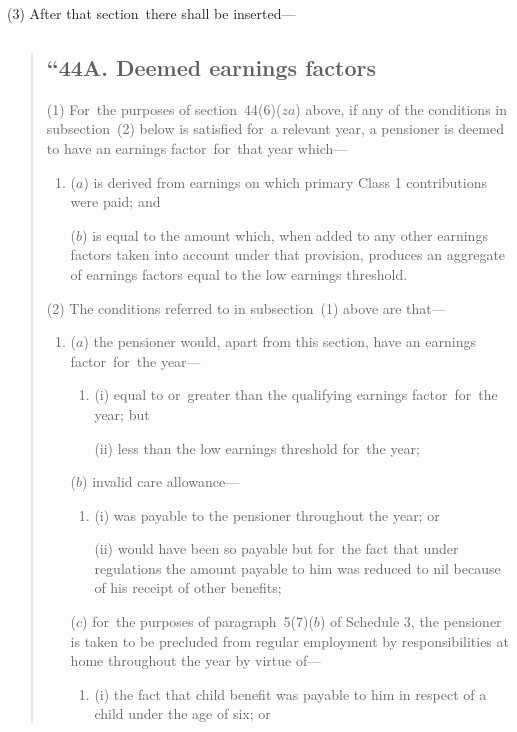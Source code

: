 \documentclass[12pt,a4paper]{article}
\begin{document}
(3) After that section~there shall be inserted—
\begin{quotation}
\subsection*{“44A. Deemed earnings factors}

(1) For~the purposes of section~44(6)($za$)  above, if any of the conditions in subsection~(2)  below is satisfied for~a relevant year, a pensioner is deemed to have an earnings factor~for~that year which—
\begin{enumerate}\item[]
($a$) is derived from earnings on which primary Class 1 contributions were paid; and

($b$) is equal to the amount which, when added to any other earnings factors taken into account under that provision, produces an aggregate of earnings factors equal to the low earnings threshold.
\end{enumerate}

(2) The conditions referred to in subsection~(1)  above are that—
\begin{enumerate}\item[]
($a$) the pensioner would, apart from this section, have an earnings factor~for~the year—
\begin{enumerate}\item[]
(i) equal to or~greater than the qualifying earnings factor~for~the year; but

(ii) less than the low earnings threshold for~the year;
\end{enumerate}

($b$) invalid care allowance—
\begin{enumerate}\item[]
(i) was payable to the pensioner throughout the year; or

(ii) would have been so payable but for~the fact that under regulations the amount payable to him was reduced to nil because of his receipt of other benefits;
\end{enumerate}

($c$) for~the purposes of paragraph~5(7)($b$)  of Schedule 3, the pensioner is taken to be precluded from regular employment by responsibilities at home throughout the year by virtue of—
\begin{enumerate}\item[]
(i) the fact that child benefit was payable to him in respect of a child under the age of six; or


\end{enumerate}
\end{enumerate}
\end{quotation}
\end{document}
